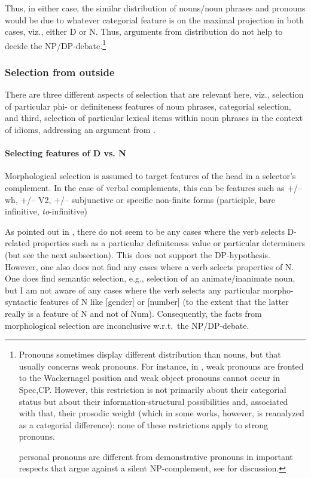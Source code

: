 \documentclass[output=paper,colorlinks,citecolor=black,
]{langscibook}
\begin{document}
 Thus, in either case, the similar distribution of nouns/noun phrases and pronouns would be due to whatever categorial feature is on the maximal projection in both cases, viz., either D or N. Thus, arguments from distribution do not help to decide the NP/DP-debate.\footnote{Pronouns sometimes display different distribution than nouns, but that usually concerns weak pronouns. For instance, in , weak pronouns are fronted to the Wackernagel position and weak object pronouns cannot occur in Spec,CP. However, this restriction is not primarily about their categorial status but about their information-structural possibilities and, associated with that, their prosodic weight (which in some works, however, is reanalyzed as a categorial difference): none of these restrictions apply to strong pronouns. 
 
   personal pronouns are different from demonstrative pronouns in important respects that argue against a silent NP-complement, see \citet[6, fn. 4]{Salzmann:2020:NP-DP} for discussion.}
 
 \subsubsection{Selection from outside}
 
 There are three different aspects of selection that are relevant here, viz., selection of particular phi- or definiteness features of noun phrases, categorial selection, and third, selection of particular lexical items within noun phrases in the context of idioms, addressing an argument from \citet{Bruening-et-al:2018:Selection-Idioms-NP}. 
 
 \paragraph{Selecting features of D vs. N}
 
  Morphological selection is assumed to target features of the head in a selector's complement. In the case of verbal complements, this can be features such as +/-- wh, +/-- V2, +/-- subjunctive or specific non-finite forms (participle, bare infinitive, \textit{to}-infinitive) 
  
 As pointed out in \citet{Bruening:2009:DP}, there do not seem to be any cases where the verb selects D-related properties such as a particular definiteness value or particular determiners (but see the next subsection). This does not support the DP-hypothesis. However, one also does not find any cases where a verb selects properties of N. One does find semantic selection, e.g., selection of an animate/inanimate noun, but I am not aware of any cases where the verb selects any particular morpho-syntactic features of N like [gender] or [number] (to the extent that the latter really is a feature of N and not of Num). Consequently, the facts from morphological selection are inconclusive w.r.t.\ the NP/DP-debate.
 
\end{document}

